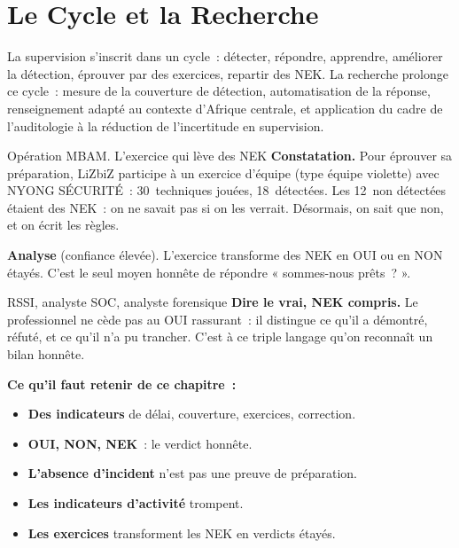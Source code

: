 \section{Le Cycle et la Recherche}
\label{sec:c20-cycle}

La supervision s'inscrit dans un cycle~: détecter, répondre, apprendre,
améliorer la détection, éprouver par des exercices, repartir des NEK. La
recherche prolonge ce cycle~: mesure de la couverture de détection,
automatisation de la réponse, renseignement adapté au contexte
d'Afrique centrale, et application du cadre de l'auditologie à la réduction
de l'incertitude en supervision.

\begin{boxscenario}{Opération MBAM. L'exercice qui lève des NEK}
\textbf{Constatation.} Pour éprouver sa préparation, LiZbiZ participe à un
exercice d'équipe (type équipe violette) avec NYONG SÉCURITÉ~: 30~techniques
jouées, 18~détectées. Les 12~non détectées étaient des NEK~: on ne savait pas
si on les verrait. Désormais, on sait que non, et on écrit les règles.

\medskip
\textbf{Analyse} (confiance élevée). L'exercice transforme des NEK en OUI ou
en NON étayés. C'est le seul moyen honnête de répondre « sommes-nous
prêts~? ».
\end{boxscenario}

\begin{boxmetier}{RSSI, analyste SOC, analyste forensique}
\textbf{Dire le vrai, NEK compris.} Le professionnel ne cède pas au OUI
rassurant~: il distingue ce qu'il a démontré, réfuté, et ce qu'il n'a pu
trancher. C'est à ce triple langage qu'on reconnaît un bilan honnête.
\end{boxmetier}

\separateur

\begin{boxresume}
\textbf{Ce qu'il faut retenir de ce chapitre~:}
\begin{itemize}
    \item \textbf{Des indicateurs} de délai, couverture, exercices,
          correction.
    \item \textbf{OUI, NON, NEK}~: le verdict honnête.
    \item \textbf{L'absence d'incident} n'est pas une preuve de préparation.
    \item \textbf{Les indicateurs d'activité} trompent.
    \item \textbf{Les exercices} transforment les NEK en verdicts étayés.
\end{itemize}
\end{boxresume}

